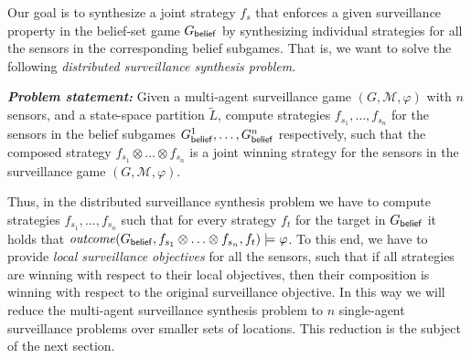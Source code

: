 Our goal is to synthesize a joint strategy $f_s$ that enforces a given surveillance property in the belief-set game $G_{\mathsf{belief}}$ by synthesizing individual strategies for all the sensors in the corresponding belief subgames. That is, we want to solve the following \emph{distributed surveillance synthesis problem}. 
 
{\textit{\textbf{Problem statement: }}}Given a multi-agent surveillance game $(G,\mathcal M,\varphi)$ with $n$ sensors, and a state-space partition $\widetilde{L}$, compute strategies $f_{s_1},\ldots,f_{s_n}$ for the sensors in the belief subgames $G^1_{\mathsf{belief}},\ldots,G^n_{\mathsf{belief}}$ respectively, such that the composed strategy $f_{s_1}\otimes\ldots\otimes f_{s_n}$ is a joint winning strategy for the sensors in the surveillance game $(G,\mathcal M,\varphi)$.

\smallskip

Thus, in the distributed surveillance synthesis problem we have to compute strategies $f_{s_1},\ldots,f_{s_n}$  such that for every strategy $f_t$ for the target in $G_{\mathsf{belief}}$ it holds that $\mathit{outcome}(G_{\mathsf{belief}},f_{s_1}\otimes\ldots\otimes f_{s_n},f_{t}) \models \varphi$. To this end, we have to provide \emph{local surveillance objectives} for all the sensors, such that if all strategies are winning with respect to their local objectives, then their composition is winning with respect to the original surveillance objective. In this way we will reduce the multi-agent surveillance synthesis problem to $n$ single-agent surveillance problems over smaller sets of locations. This reduction is the subject of the next section.



